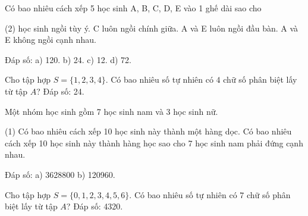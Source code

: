 \begin{vd}
	Có bao nhiêu cách xếp 5 học sinh A, B, C, D, E vào 1 ghế dài sao cho 
	\begin{tasks}(2)
		 học sinh ngồi tùy ý.
		\task C luôn ngồi chính giữa.
		\task A và E luôn ngồi đầu bàn.
		\task A và E không ngồi cạnh nhau.
	\end{tasks}
\hspace*{8cm} {\sf\fontsize{10pt}{1pt}\selectfont Đáp số: a) 120. \quad b) 24. \quad c) 12. \quad d) 72.}
\end{vd} 
\begin{vd}%
	Cho tập hợp $S=\{1,2,3,4\}$. Có bao nhiêu số tự nhiên có $4$ chữ số phân biệt lấy từ tập $A$?
	\hspace*{6cm} {\sf\fontsize{10pt}{1pt}\selectfont Đáp số: 24.}
\end{vd} 

\begin{vd}
	Một nhóm học sinh gồm 7 học sinh nam và 3 học sinh nữ. 
	\begin{tasks}(1)
		\task Có bao nhiêu cách xếp 10 học sinh này thành một hàng dọc.
		\task Có bao nhiêu cách xếp 10 học sinh này thành hàng học sao cho 7 học sinh nam phải đứng cạnh nhau.
	\end{tasks}
\hspace*{8cm} {\sf\fontsize{10pt}{1pt}\selectfont Đáp số: a) 3628800 \quad b) 120960.}
\end{vd} 

\begin{vd}%
	Cho tập hợp $S=\{0,1,2,3,4,5,6\}$. Có bao nhiêu số tự nhiên có $7$ chữ số phân biệt lấy từ tập $A$?
	\hspace*{6cm} {\sf\fontsize{10pt}{1pt}\selectfont Đáp số: 4320.}
\end{vd} 

